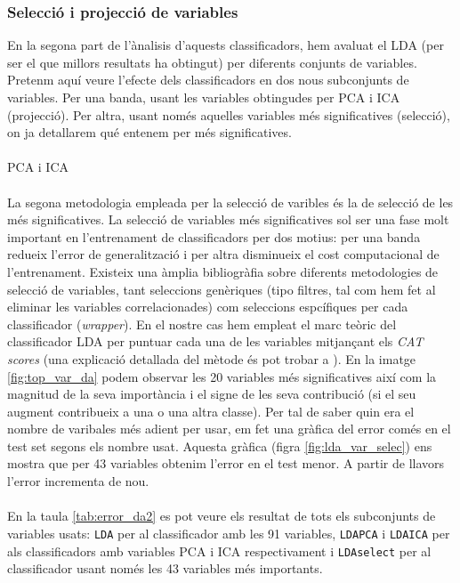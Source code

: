 \documentclass[a4paper,10pt]{article}
\begin{document}
\subsubsection{Selecció i projecció de variables}
En la segona part de l'ànalisis d'aquests classificadors, hem avaluat el LDA (per ser el que millors resultats ha obtingut) per diferents conjunts de variables. Pretenm aquí veure l'efecte dels classificadors en dos nous subconjunts de variables. Per una banda, usant les variables obtingudes per PCA i ICA (projecció). Per altra, usant només aquelles variables més significatives (selecció), on ja detallarem qué entenem per més significatives.  
\\
\\
PCA i ICA
\\
\\
La segona metodologia empleada per la selecció de varibles és la de selecció de les més significatives. La selecció de variables més significatives sol ser una fase molt important en l'entrenament de classificadors per dos motius: per una banda redueix l'error de generalització i per altra disminueix el cost computacional de l'entrenament. Existeix una àmplia bibliogràfia sobre diferents metodologies de selecció de variables, tant seleccions genèriques (tipo filtres, tal com hem fet al eliminar les variables correlacionades) com seleccions espcífiques per cada classificador (\textit{wrapper}). En el nostre cas hem empleat el marc teòric del classificador LDA per puntuar cada una de les variables mitjançant els \textit{CAT scores} (una explicació detallada del mètode és pot trobar a \cite{strimmer10}). En la imatge \ref{fig:top_var_da} podem observar les 20 variables més significatives així com la magnitud de la seva importància i el signe de les seva contribució (si el seu augment contribueix a una o una altra classe). Per tal de saber quin era el nombre de varibales més adient per usar, em fet una gràfica del error comés en el test set segons els nombre usat. Aquesta gràfica (figra \ref{fig:lda_var_selec}) ens mostra que per 43 variables obtenim l'error en el test menor. A partir de llavors l'error incrementa de nou.
\\
\\
En la taula \ref{tab:error_da2} es pot veure els resultat de tots els subconjunts de variables usats: \texttt{LDA} per al classificador amb les 91 variables, \texttt{LDAPCA} i \texttt{LDAICA} per als classificadors amb variables PCA i ICA respectivament i \texttt{LDAselect} per al classificador usant només les 43 variables més importants. 
\end{document}
